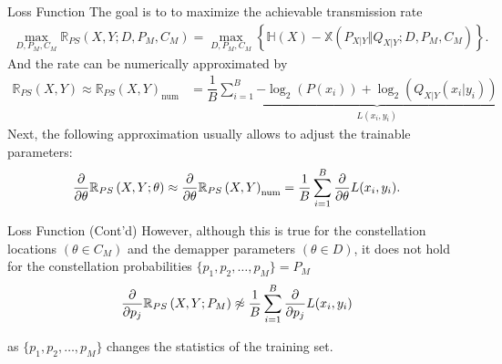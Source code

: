 \documentclass[english,aspectratio=1610,9pt,helvet,nicetitles]{ICEbeamerTUMCD}
\begin{document}
\begin{frame}{Loss Function}
	The goal is to to maximize the achievable transmission rate
	\begin{align}
		 \max_{D, P_M, C_M} \mathbb{R}_{PS} \left(X , Y ; D, P_M, C_M \right) = \max_{D, P_M, C_M} \left\lbrace \mathbb{H}(X) - \mathbb{X}(P_{X|Y} \Vert Q_{X|Y} ; D, P_M, C_M)\right\rbrace.
	\end{align}
	And the rate can be numerically approximated by
	\begin{align}
		\mathbb{R}_{PS} \left(X , Y\right) \approx \mathbb{R}_{PS} \left(X , Y\right)_{\text{num}} &= \dfrac{1}{B} \sum \limits_{i = 1}^{B} \underbrace{- \log_2(P(x_i)) + \log_2(Q_{X|Y}(x_i|y_i))}_{L(x_i, y_i)}
	\end{align}
	Next, the following approximation usually allows to adjust the trainable parameters:
	\begin{align}
		\pdv{\theta} \mathbb{R}_{PS} \left(X , Y ; \theta \right) \approx \pdv{\theta} \mathbb{R}_{PS} \left(X , Y\right)_{\text{num}} = \dfrac{1}{B} \sum \limits_{i = 1}^{B} \pdv{\theta} L(x_i, y_i).
	\end{align}
\end{frame}

\begin{frame}{Loss Function (Cont'd)}
	However, although this is true for the constellation locations $(\theta \in C_M)$ and the demapper parameters $(\theta \in D)$, it does not hold for the constellation probabilities $\{p_1, p_2, \dots, p_M\} = P_M$
	\begin{align}
	\label{eqn:mi_pdv_p}
		\pdv{p_j} \mathbb{R}_{PS} \left(X , Y ; P_M \right) \not\approx \dfrac{1}{B} \sum \limits_{i = 1}^{B} \pdv{p_j} L(x_i, y_i)
	\end{align}
	
	as $\{p_1, p_2, \dots, p_M\}$ changes the statistics of the training set.
	
	\end{frame}
\end{document}
